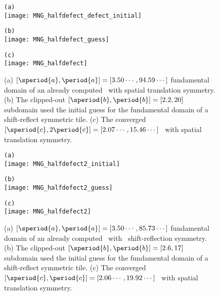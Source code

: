 \begin{itemize}
{\begin{figure}
\begin{minipage}[height=.4\textheight]{.5\textwidth}
\centering \small{\texttt{(a)}}\\
\texttt{[image: MNG\_halfdefect\_defect\_initial]}
\end{minipage}
\begin{minipage}[height=.4\textheight]{.5\textwidth}
\centering \small{\texttt{(b)}}\\
\texttt{[image: MNG\_halfdefect\_guess]}
\end{minipage}
\begin{minipage}[height=.1\textheight]{\textwidth}
\centering \small{\texttt{(c)}}\\
\texttt{[image: MNG\_halfdefect]}
\end{minipage}
\caption{ \label{fig:halfdefect}
(a)
$[\speriod{a},\period{a}]=[3.50\cdots,94.59\cdots]$ fundamental domain
of an already computed \twot\ with spatial translation symmetry.
(b)
The clipped-out $[\speriod{b},\period{b}]=[2.2,20]$ subdomain used the
initial guess for the fundamental domain of a shift-reflect symmetric tile.
(c)
The converged $[\speriod{c},2\period{c}]=[2.07\cdots,15.46\cdots]$ \twot\
with spatial translation symmetry.
}
\end{figure}

\begin{figure}
\begin{minipage}[height=.4\textheight]{.5\textwidth}
\centering \small{\texttt{(a)}}\\
\texttt{[image: MNG\_halfdefect2\_initial]}
\end{minipage}
\begin{minipage}[height=.4\textheight]{.5\textwidth}
\centering \small{\texttt{(b)}}\\
\texttt{[image: MNG\_halfdefect2\_guess]}
\end{minipage}
\begin{minipage}[height=.1\textheight]{\textwidth}
\centering \small{\texttt{(c)}}\\
\texttt{[image: MNG\_halfdefect2]}
\end{minipage}
\caption{ \label{fig:halfdefect2}
(a)
$[\speriod{a},\period{a}]=[3.50\cdots,85.73\cdots]$ fundamental domain
of an already computed \twot\ with \spt\ shift-reflection symmetry.
(b)
The clipped-out $[\speriod{b},\period{b}]=[2.6,17]$ subdomain used the
initial guess for the fundamental domain of a shift-reflect symmetric tile.
(c)
The converged $[\speriod{c},\period{c}]=[2.06\cdots,19.92\cdots]$ \twot\
with spatial translation symmetry.
}
\end{figure}

}
\end{itemize}
